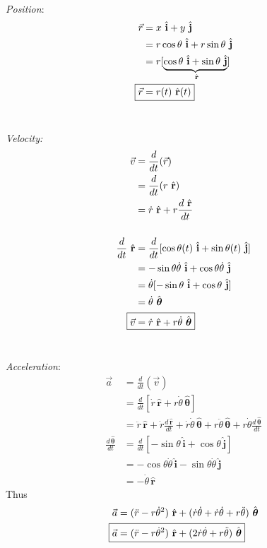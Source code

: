 \documentclass[twoside]{scrartcl}
\let\oldhat\hat
\renewcommand{\hat}[1]{\,\oldhat{\boldsymbol{\mathbf{#1}}}}
\begin{document}
\begin{definition}~

\emph{Position}:
\[
\begin{aligned}
\vec{r} &= x\hat{i} + y\hat{j}\\
&= r\cos\theta\hat{i} + r\sin\theta\hat{j}\\
&= r[\underbrace{\cos\theta\hat{i} + \sin\theta\hat{j}}_{\hat{r}}]\\
\Aboxed{\vec{r} &= r(t)\hat{r}(t)}	
\end{aligned}
\]~

\emph{Velocity:}
\[
\begin{aligned}
  \vec{v} &= \frac{d}{dt}(\vec{r})\\
  &= \frac{d}{dt}(r\hat{r})\\
  &= \dot{r}\hat{r} + r\frac{d\hat{r}}{dt}\\[0.5cm]
  \frac{d}{dt}\hat{r} &= \frac{d}{dt}[\cos\theta(t)\hat{i} + \sin\theta(t)\hat{j}]\\
  &= -\sin\theta\dot{\theta}\hat{i} + \cos\theta\dot{\theta}\hat{j}\\
  &= \dot{\theta}[-\sin\theta\hat{i} + \cos\theta\hat{j}]\\
  &= \dot{\theta}\hat{\theta}\\
  \Aboxed{\vec{v} &= \dot{r}\hat{r} + r\dot{\theta}\hat{\theta}}
\end{aligned}
\]~

\emph{Acceleration}:
\[
\begin{aligned}
  \vec{a} &= \frac{d}{dt}(\vec{v})\\
  &= \frac{d}{dt}[\dot{r}\hat{r} + r\dot{\theta}\hat{\theta}]\\
  &= \ddot{r}\hat{r} + \dot{r}\frac{d\hat{r}}{dt} + \dot{r}\dot{\theta}\hat{\theta} + r\ddot{\theta}\hat{\theta} + r\dot{\theta}\frac{d\hat{\theta}}{dt}\\[0.5cm]
    \frac{d\hat{\theta}}{dt} &= \frac{d}{dt}[-\sin\theta\hat{i} + \cos\theta\hat{j}]\\
  &= -\cos\theta\dot{\theta}\hat{i} - \sin\theta\dot{\theta}\hat{j}\\
  &= -\dot{\theta}\hat{r}
\end{aligned}
\]
Thus
\[
\begin{aligned}
  \vec{a} &= (\ddot{r} - r\dot{\theta}^2)\hat{r} + (\dot{r}\dot{\theta} + \dot{r}\dot{\theta} + r\ddot{\theta})\hat{\theta} \\
 \Aboxed{\vec{a} &= (\ddot{r} - r\dot{\theta}^2)\hat{r} + (2\dot{r}\dot{\theta} + r\ddot{\theta})\hat{\theta}}
\end{aligned}
\]
\end{definition}
\end{document}
